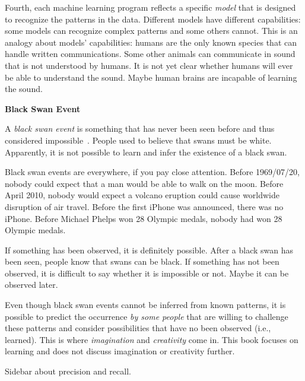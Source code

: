 Fourth, each machine learning program reflects a specific {\it model}
that is designed to recognize the patterns in the data.  Different
models have different capabilities: some models can recognize complex
patterns and some others cannot.  This is an analogy about models'
capabilities: humans are the only known species that can handle
written communications.  Some other animals can communicate in sound
that is not understood by humans. It is not yet clear whether humans
will ever be able to understand the sound.  Maybe human brains are
incapable of learning the sound.


    {\bf Black Swan Event}

    
  A {\it black swan event} is something that has never been seen
  before and thus considered
  impossible~\cite{Taleb2010BlackSwan}.  People
  used to believe that swans must be white. Apparently, it is not
  possible to learn and infer the existence of a black swan.

  
  Black swan events are everywhere, if you pay close attention.
  Before 1969/07/20, nobody could expect that a man would be able to
  walk on the moon. Before April 2010, nobody would expect a volcano
  eruption could cause worldwide disruption of air travel.  Before the
  first iPhone was announced, there was no iPhone. Before Michael
  Phelps won 28 Olympic medals, nobody had won 28 Olympic medals.


  If something has been observed, it is definitely possible.  After a
  black swan has been seen, people know that swans can be black.  If
  something has not been observed, it is difficult to say whether it
  is impossible or not. Maybe it can be observed later.



  Even though black swan events cannot be inferred  from known patterns,
  it is possible to predict the occurrence {\it by some people} that
  are willing to challenge these patterns and consider
  possibilities that have no been observed (i.e., learned). This
  is where {\it imagination} and {\it creativity} come in.
  This book focuses on learning  and does not discuss imagination or
  creativity further.

    
  


Sidebar about precision and recall.


